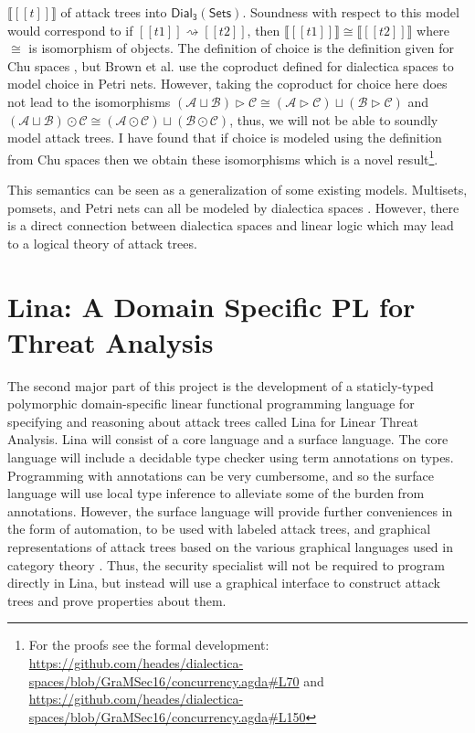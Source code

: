\documentclass{llncs}
\newcommand{\interp}[1]{\llbracket #1 \rrbracket}
\newcommand{\cat}[1]{\mathcal{#1}}
\newcommand{\dial}[0]{\mathsf{Dial_3}(\mathsf{Sets})}
\begin{document}
$\interp{[[t]]}$ of attack trees into $\dial$.  Soundness with respect
to this model would correspond to if $[[t1]] \rightsquigarrow [[t2]]$,
then $\interp{[[t1]]} \cong \interp{[[t2]]}$ where $\cong$ is
isomorphism of objects.  The definition of choice is the definition
given for Chu spaces \cite{Gupta:1994}, but Brown et al. use the
coproduct defined for dialectica spaces to model choice in Petri nets.
However, taking the coproduct for choice here does not lead to the
isomorphisms $(\cat{A} \sqcup \cat{B}) \rhd \cat{C} \cong (\cat{A}
\rhd \cat{C}) \sqcup (\cat{B} \rhd \cat{C})$ and $(\cat{A} \sqcup
\cat{B}) \odot \cat{C} \cong (\cat{A} \odot \cat{C}) \sqcup (\cat{B}
\odot \cat{C})$, thus, we will not be able to soundly model attack
trees.  I have found that if choice is modeled using the definition
from Chu spaces \cite{Gupta:1994} then we obtain these isomorphisms
which is a novel result\footnote{For the proofs see the formal
  development:
  \url{https://github.com/heades/dialectica-spaces/blob/GraMSec16/concurrency.agda\#L70}
  and
  \url{https://github.com/heades/dialectica-spaces/blob/GraMSec16/concurrency.agda\#L150}}.

This semantics can be seen as a generalization of some existing
models.  Multisets, pomsets, and Petri nets can all be modeled by
dialectica spaces \cite{Brown:1991,Gupta:1994}.  However, there is a
direct connection between dialectica spaces and linear logic which
may lead to a logical theory of attack trees.

\section{Lina: A Domain Specific PL for Threat Analysis}
\label{sec:lina:_a_domain_specific_pl_for_threat_analysis}

The second major part of this project is the development of a
staticly-typed polymorphic domain-specific linear functional
programming language for specifying and reasoning about attack trees
called Lina for Linear Threat Analysis.  Lina will consist of a core
language and a surface language.  The core language will include a
decidable type checker using term annotations on types.  Programming
with annotations can be very cumbersome, and so the surface language
will use local type inference \cite{Pierce:2000} to alleviate some of
the burden from annotations.  However, the surface language will
provide further conveniences in the form of automation, to be used
with labeled attack trees, and graphical representations of attack
trees based on the various graphical languages used in category theory
\cite{Selinger:2009}.  Thus, the security specialist will not be
required to program directly in Lina, but instead will use a graphical
interface to construct attack trees and prove properties about them.
\end{document}
